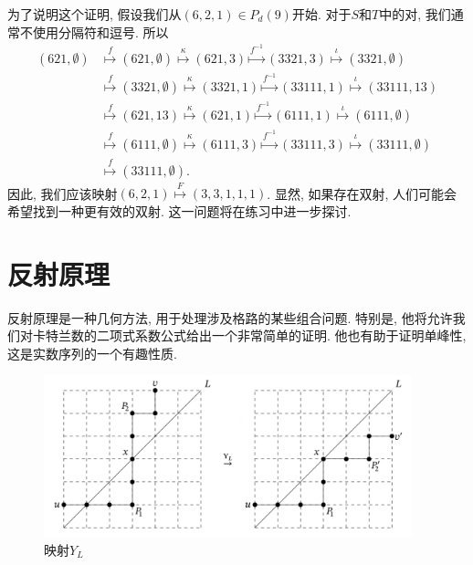 \documentclass{ctexbook}
\begin{document}
	为了说明这个证明, 假设我们从$(6,2,1)\in P_{d}(9)$开始. 对于$S$和$T$中的对, 我们通常不使用分隔符和逗号. 所以
\[
\begin{aligned}
	(621,\emptyset) &\stackrel{f}{\mapsto}(621,\emptyset)\stackrel{\kappa}{\mapsto}(621,3)\stackrel{f^{-1}}{\mapsto}(3321,3)\stackrel{\iota}{\mapsto}(3321,\emptyset) \\
	&\stackrel{f}{\mapsto}(3321,\emptyset)\stackrel{\kappa}{\mapsto}(3321,1)\stackrel{f^{-1}}{\mapsto}(33111,1)\stackrel{\iota}{\mapsto}(33111,13) \\
	&\stackrel{f}{\mapsto}(621,13)\stackrel{\kappa}{\mapsto}(621,1)\stackrel{f^{-1}}{\mapsto}(6111,1)\stackrel{\iota}{\mapsto}(6111,\emptyset) \\
	&\stackrel{f}{\mapsto}(6111,\emptyset)\stackrel{\kappa}{\mapsto}(6111,3)\stackrel{f^{-1}}{\mapsto}(33111,3)\stackrel{\iota}{\mapsto}(33111,\emptyset) \\
	&\stackrel{f}{\mapsto}(33111,\emptyset).
\end{aligned}
\]
	因此, 我们应该映射$(6,2,1)\stackrel{F}{\mapsto}(3,3,1,1,1)$. 显然, 如果存在双射, 人们可能会希望找到一种更有效的双射. 这一问题将在练习中进一步探讨.


\section{反射原理}
	反射原理是一种几何方法, 用于处理涉及格路的某些组合问题. 特别是, 他将允许我们对卡特兰数的二项式系数公式给出一个非常简单的证明. 他也有助于证明单峰性, 这是实数序列的一个有趣性质.
\begin{figure}[htbp]
	\centering
	\includegraphics*[width=0.95\textwidth]{./fig2/4.jpg}
	\caption{映射$Y_{L}$}
\end{figure}
\end{document}
